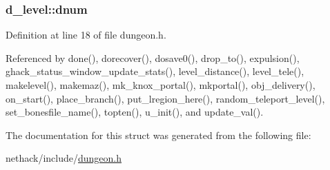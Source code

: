 \hypertarget{structd__level_a035d301f0a8cafc6c757fbbda2b6935e}{
\subsubsection[{dnum}]{ d\+\_\+level\+::dnum}}\label{structd__level_a035d301f0a8cafc6c757fbbda2b6935e}


Definition at line 18 of file dungeon.\+h.



Referenced by done(), dorecover(), dosave0(), drop\+\_\+to(), expulsion(), ghack\+\_\+status\+\_\+window\+\_\+update\+\_\+stats(), level\+\_\+distance(), level\+\_\+tele(), makelevel(), makemaz(), mk\+\_\+knox\+\_\+portal(), mkportal(), obj\+\_\+delivery(), on\+\_\+start(), place\+\_\+branch(), put\+\_\+lregion\+\_\+here(), random\+\_\+teleport\+\_\+level(), set\+\_\+bonesfile\+\_\+name(), topten(), u\+\_\+init(), and update\+\_\+val().



The documentation for this struct was generated from the following file\+:\begin{DoxyCompactItemize}
\item 
nethack/include/\hyperlink{dungeon_8h}{dungeon.\+h}\end{DoxyCompactItemize}
